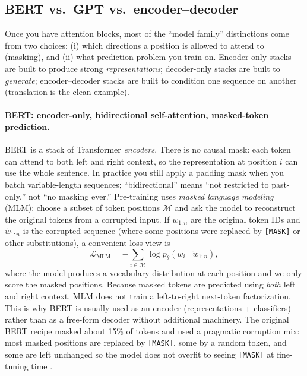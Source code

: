 \subsection{BERT vs.\ GPT vs.\ encoder--decoder}
\label{sec:transformers_model_families}
Once you have attention blocks, most of the ``model family'' distinctions come from two choices: (i) which directions a position is allowed to attend to (masking), and (ii) what prediction problem you train on. Encoder-only stacks are built to produce strong \emph{representations}; decoder-only stacks are built to \emph{generate}; encoder--decoder stacks are built to condition one sequence on another (translation is the clean example).

\paragraph{BERT: encoder-only, bidirectional self-attention, masked-token prediction.}
BERT \citep{Devlin2019} is a stack of Transformer \emph{encoders}. There is no causal mask: each token can attend to both left and right context, so the representation at position \(i\) can use the whole sentence. In practice you still apply a padding mask when you batch variable-length sequences; ``bidirectional'' means ``not restricted to past-only,'' not ``no masking ever.''
Pre-training uses \emph{masked language modeling} (MLM): choose a subset of token positions \(\mathcal{M}\) and ask the model to reconstruct the original tokens from a corrupted input. If \(w_{1:n}\) are the original token IDs and \(\tilde{w}_{1:n}\) is the corrupted sequence (where some positions were replaced by \texttt{[MASK]} or other substitutions), a convenient loss view is
\begin{equation}
    \mathcal{L}_{\text{MLM}}
    = -\sum_{i\in\mathcal{M}} \log p_\theta\!\left(w_i \mid \tilde{w}_{1:n}\right),
    \label{eq:transformers_mlm_objective}
\end{equation}
where the model produces a vocabulary distribution at each position and we only score the masked positions.
Because masked tokens are predicted using \emph{both} left and right context, MLM does not train a left-to-right next-token factorization. This is why BERT is usually used as an encoder (representations + classifiers) rather than as a free-form decoder without additional machinery.
The original BERT recipe masked about 15\% of tokens and used a pragmatic corruption mix: most masked positions are replaced by \texttt{[MASK]}, some by a random token, and some are left unchanged so the model does not overfit to seeing \texttt{[MASK]} at fine-tuning time \citep{Devlin2019}.

